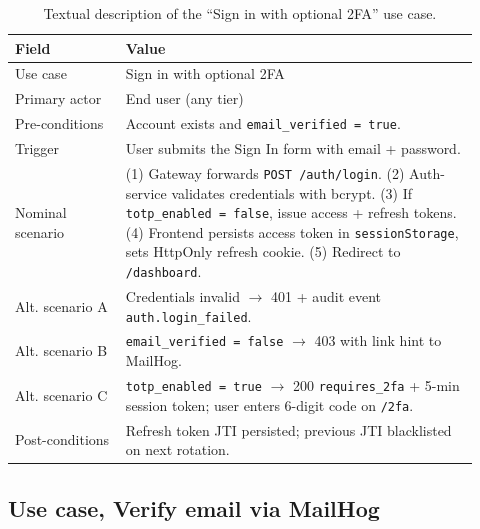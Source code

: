 \documentclass[12pt, a4paper, oneside]{report}
\begin{document}
\begin{table}[H]
\centering
\caption{Textual description of the ``Sign in with optional 2FA'' use case.}
\label{tab:uc_signin}
\begin{tabular}{|p{0.22\linewidth}|L{0.7\linewidth}|}
\hline
\textbf{Field} & \textbf{Value} \\
\hline
Use case & Sign in with optional 2FA \\ \hline
Primary actor & End user (any tier) \\ \hline
Pre-conditions & Account exists and \texttt{email\_verified = true}. \\ \hline
Trigger & User submits the Sign In form with email + password. \\ \hline
Nominal scenario & (1) Gateway forwards \texttt{POST /auth/login}.
(2) Auth-service validates credentials with bcrypt.
(3) If \texttt{totp\_enabled = false}, issue access + refresh tokens.
(4) Frontend persists access token in \texttt{sessionStorage}, sets HttpOnly refresh cookie.
(5) Redirect to \texttt{/dashboard}. \\ \hline
Alt. scenario A & Credentials invalid $\to$ 401 + audit event \texttt{auth.login\_failed}. \\ \hline
Alt. scenario B & \texttt{email\_verified = false} $\to$ 403 with link hint to MailHog. \\ \hline
Alt. scenario C & \texttt{totp\_enabled = true} $\to$ 200 \texttt{requires\_2fa} + 5-min session token; user enters 6-digit code on \texttt{/2fa}. \\ \hline
Post-conditions & Refresh token JTI persisted; previous JTI blacklisted on next rotation. \\
\hline
\end{tabular}
\end{table}

\subsection{Use case, Verify email via MailHog}
\end{document}
